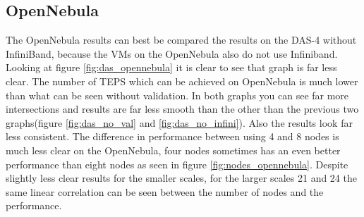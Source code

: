 \subsection{OpenNebula}
The OpenNebula results can best be compared the results on the DAS-4 without InfiniBand, because the VMs on the OpenNebula also do not use Infiniband.
Looking at figure \ref{fig:das_opennebula} it is clear to see that graph is far less clear. The number of TEPS which can be achieved on OpenNebula is much lower than what can be seen without validation. In both graphs you can see far more intersections and results are far less smooth than the other than the previous two graphs(figure \ref{fig:das_no_val} and \ref{fig:das_no_infini}). Also the results look far less consistent. The difference in performance between using 4 and 8 nodes is much less clear on the OpenNebula, four nodes sometimes has an even better performance than eight nodes as seen in figure \ref{fig:nodes_opennebula}.
Despite slightly less clear results for the smaller scales, for the larger scales 21 and 24 the same linear correlation can be seen between the number of nodes and the performance.

